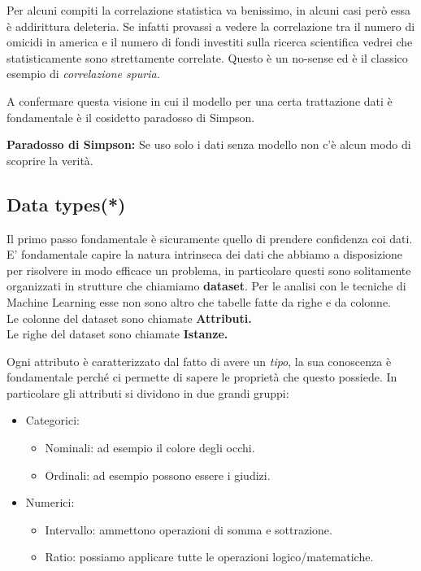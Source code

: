 Per alcuni compiti la correlazione statistica va benissimo, in alcuni casi però essa è addirittura deleteria.  Se infatti provassi a vedere la correlazione tra il numero di omicidi in america e il numero di fondi investiti sulla ricerca scientifica vedrei che statisticamente sono strettamente correlate. Questo è un no-sense ed è il classico esempio di \textit{correlazione spuria.}

A confermare questa visione in cui il modello per una certa trattazione dati è fondamentale è il cosidetto paradosso di Simpson.

\textbf{Paradosso di Simpson:} Se uso solo i dati senza modello non c'è alcun modo di scoprire la verità.


\subsection{Data types(*)}

Il primo passo fondamentale è sicuramente quello di prendere confidenza coi dati. E' fondamentale capire la natura intrinseca dei dati che abbiamo a disposizione per risolvere in modo efficace un problema, in particolare questi sono solitamente organizzati in strutture che chiamiamo \textbf{dataset}. Per le analisi con le tecniche di Machine Learning esse non sono altro che tabelle fatte da righe e da colonne.
\\Le colonne del dataset sono chiamate \textbf{Attributi.}
\\Le righe del dataset sono chiamate \textbf{Istanze.}

Ogni attributo è caratterizzato dal fatto di avere un \textit{tipo}, la sua conoscenza è fondamentale perché ci permette di sapere le proprietà che questo possiede.
In particolare gli attributi si dividono in due grandi gruppi:
\begin{itemize}
	\item Categorici:
	\begin{itemize}
		\item Nominali: ad esempio il colore degli occhi.
		\item Ordinali: ad esempio possono essere i giudizi.
	\end{itemize}
	\item Numerici:
	\begin{itemize}
		\item Intervallo: ammettono operazioni di somma e sottrazione. 
		\item Ratio: possiamo applicare tutte le operazioni logico/matematiche.
	\end{itemize}
\end{itemize}



